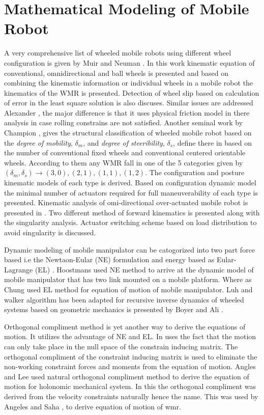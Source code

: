 \section{Mathematical Modeling of Mobile Robot}
A very comprehensive list of wheeled mobile robots using different wheel configuration is given by Muir and Neuman \cite{muir1987kinematic}. In this work kinematic equation of conventional, omnidirectional and ball wheels is presented and based on combining the kinematic information or   individual wheels in a mobile robot  the kinematics of the WMR is presented. Detection of wheel slip based on calculation of error in the least square solution is also discuses. Similar issues are addressed Alexander \cite{alexander1989kinematics}, the major difference is that it uses physical friction model in there analysis in case rolling constrains are not satisfied. Another seminal work by Champion \cite{campion1996structural}, gives the structural classification of wheeled mobile robot based on the \textit{degree of mobility}, $\delta_m$, and \textit{degree of steeribility}, $\delta_s$, define there in based on the number of conventional fixed wheels and  conventional centered orientable wheels. According to them any WMR fall in one of the 5 categories given by $(\delta_m,\delta_s)\rightarrow(3,0),(2,1),(1,1),(1,2)$. The configuration and posture kinematic models of each type is derived. Based on configuration dynamic model the minimal number of actuators required for full maneuverability of each type is presented. Kinematic analysis of omi-directional over-actuated mobile robot  is presented in \cite{yi2002kinematics}. Two different method of forward kinematics is presented along with the singularity analysis. Actuator switching scheme based on load distribution to avoid singularity is discussed. 

Dynamic modeling of mobile manipulator can be catogorized into two part force based i.e the Newtaon-Eular (NE) formulation and  energy based as Eular-Lagrange (EL) . Hoostmans \cite{hootsmans1992motion} used NE method to arrive at  the dynamic model of mobile manipulator that has two link mounted on a mobile platform. Where as Chung \cite{chung1998interaction} used EL method for equation of motion of mobile manipulator.  Luh and walker \cite{luh1980line} algorithm has been adapted for recursive inverse dynamics of wheeled systems based on geometric mechanics  is presented by Boyer and Ali \cite{boyer2011recursive}.   

Orthogonal compliment method is yet another way to derive the equations of motion. It utilizes the advantage of NE and EL. In uses the fact that the motion can only take place in the null space of the constrain inducing matrix. The orthogonal compliment of the constraint inducing matrix is used to eliminate the non-working constraint  forces  and moments from the equation of motion.  Angles and Lee \cite{angeles1988formulation} used natural orthogonal compliment method to derive the equation of motion for holonomic mechanical system. In this the orthogonal compliment was derived from the velocity constraints naturally hence the name. This was  used by Angeles \cite{angeles2013fundamentals} and Saha \cite{saha1989kinematics},\cite{saha1991dynamics} to derive equation of motion of wmr. 

